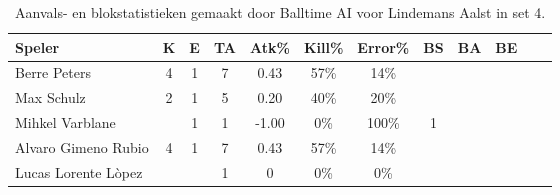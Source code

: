 \begin{table}[ht!]
  \centering
  \scriptsize
  \begin{tabular}{|l|c|c|c|c|c|c|c|c|c|c|c|} \hline
    \textbf{Speler} &  K & E & TA & Atk\% & Kill\% & Error\% & BS & BA & BE \\ \hline
    Berre Peters & 4 & 1 & 7 & 0.43 & 57\% & 14\% &  &  & \\
    Max Schulz & 2 & 1 & 5 & 0.20 & 40\% & 20\% &  &  & \\
    Mihkel Varblane &  & 1 & 1 & -1.00 & 0\% & 100\% & 1 & & \\
    Alvaro Gimeno Rubio & 4 & 1 & 7 & 0.43 & 57\% & 14\% &  &  & \\
    Lucas Lorente Lòpez &  &  & 1 & 0 & 0\% & 0\% &  &  &\\ \hline
  \end{tabular}
  \caption[Aanvals- en blokstatistieken gemaakt door Balltime AI voor Lindemans Aalst in set 4]{\label{tab:PL3AttBlockAalstAI4}Aanvals- en blokstatistieken gemaakt door Balltime AI voor Lindemans Aalst in set 4.}
\end{table}
